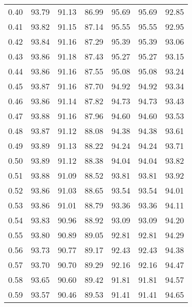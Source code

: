 \begin{tabular}{|c|c|c|c|c|c|c|}
      0.40 &     93.79 &     91.13 &      86.99 &   95.69 &      95.69 &         92.85 \\
      0.41 &     93.82 &     91.15 &      87.14 &   95.55 &      95.55 &         92.95 \\
      0.42 &     93.84 &     91.16 &      87.29 &   95.39 &      95.39 &         93.06 \\
      0.43 &     93.86 &     91.18 &      87.43 &   95.27 &      95.27 &         93.15 \\
      0.44 &     93.86 &     91.16 &      87.55 &   95.08 &      95.08 &         93.24 \\
      0.45 &     93.87 &     91.16 &      87.70 &   94.92 &      94.92 &         93.34 \\
      0.46 &     93.86 &     91.14 &      87.82 &   94.73 &      94.73 &         93.43 \\
      0.47 &     93.88 &     91.16 &      87.96 &   94.60 &      94.60 &         93.53 \\
      0.48 &     93.87 &     91.12 &      88.08 &   94.38 &      94.38 &         93.61 \\
      0.49 &     93.89 &     91.13 &      88.22 &   94.24 &      94.24 &         93.71 \\
      0.50 &     93.89 &     91.12 &      88.38 &   94.04 &      94.04 &         93.82 \\
      0.51 &     93.88 &     91.09 &      88.52 &   93.81 &      93.81 &         93.92 \\
      0.52 &     93.86 &     91.03 &      88.65 &   93.54 &      93.54 &         94.01 \\
      0.53 &     93.86 &     91.01 &      88.79 &   93.36 &      93.36 &         94.11 \\
      0.54 &     93.83 &     90.96 &      88.92 &   93.09 &      93.09 &         94.20 \\
      0.55 &     93.80 &     90.89 &      89.05 &   92.81 &      92.81 &         94.29 \\
      0.56 &     93.73 &     90.77 &      89.17 &   92.43 &      92.43 &         94.38 \\
      0.57 &     93.70 &     90.70 &      89.29 &   92.16 &      92.16 &         94.47 \\
      0.58 &     93.65 &     90.60 &      89.42 &   91.81 &      91.81 &         94.57 \\
      0.59 &     93.57 &     90.46 &      89.53 &   91.41 &      91.41 &         94.65 \\

\end{tabular}
